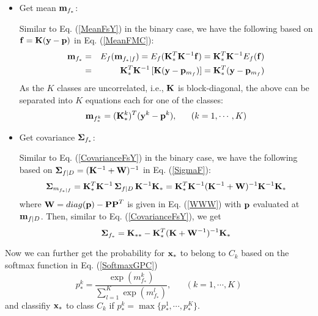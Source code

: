 \documentclass{article}
\begin{document}
\begin{itemize}
\item Get mean ${\bf m}_{f_*}$:

  Similar to Eq. (\ref{MeanFsY}) in the binary case, we have 
  the following based on ${\bf f}={\bf K}({\bf y}-{\bf p})$ in 
  Eq. (\ref{MeanFMC}):
  \begin{eqnarray}
    {\bf m}_{f_*} &=& E_f({\bf m}_{f_*|f})
    =E_f ({\bf K}_*^T{\bf K}^{-1}{\bf f})={\bf K}_*^T{\bf K}^{-1}E_f({\bf f})
    \nonumber\\
    &=&{\bf K}_*^T{\bf K}^{-1}\,[{\bf K}({\bf y}-{\bf p}_{m_f})]
    ={\bf K}_*^T({\bf y}-{\bf p}_{m_f})
  \end{eqnarray}
  As the $K$ classes are uncorrelated, i.e., ${\bf K}$ is block-diagonal,
  the above can be separated into $K$ equations each for one of the classes:
  \begin{equation}
    {\bf m}_{f_*^k}=({\bf K}_*^k)^T({\bf y}^k-{\bf p}^k),
    \;\;\;\;\;\;(k=1,\cdots,K)
  \end{equation}

\item Get covariance ${\bf\Sigma}_{f_*}$:

  Similar to Eq. (\ref{CovarianceFsY}) in the binary case, we have
  the following based on ${\bf\Sigma}_{f|D}=({\bf K}^{-1}+{\bf W})^{-1}$ 
  in Eq. (\ref{SigmaF}):
  \begin{equation}
    {\bf\Sigma}_{m_{f_*|f}}
    ={\bf K}_*^T {\bf K}^{-1}\,{\bf\Sigma}_{f|D} \,{\bf K}^{-1}{\bf K}_*
    ={\bf K}_*^T {\bf K}^{-1} ({\bf K}^{-1}+{\bf W})^{-1} {\bf K}^{-1}{\bf K}_*
  \end{equation}
  where ${\bf W}=diag({\bf p})-{\bf PP}^T$ is given in Eq. (\ref{WWW}) 
  with ${\bf p}$ evaluated at ${\bf m}_{f|D}$. Then, similar to
  Eq. (\ref{CovarianceFsY}), we get
  \begin{equation}
    {\bf\Sigma}_{f_*}={\bf K}_{**}-{\bf K}_*^T({\bf K}+{\bf W}^{-1})^{-1}{\bf K}_*
  \end{equation}
\end{itemize}

Now we can further get the probability for ${\bf x}_*$ to belong to
$C_k$ based on the softmax function in Eq. (\ref{SoftmaxGPC}) 
\begin{equation}
  p_*^k=\frac{\exp(m_{f_*}^k)}{\sum_{l=1}^K\exp(m_{f_*}^l)},
  \;\;\;\;\;\;(k=1,\cdots,K)
\end{equation}
and classifiy ${\bf x}_*$ to class $C_k$ if 
$p_*^k=\max\{ p_*^1,\cdots,p_*^K \}$.
\end{document}
